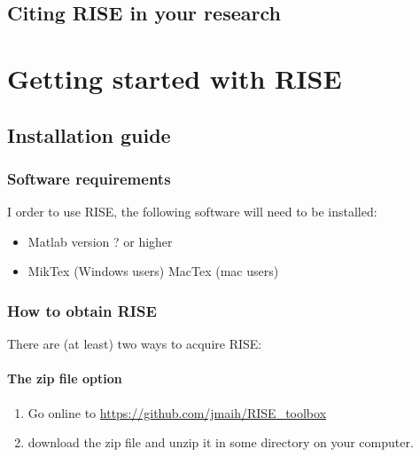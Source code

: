 \documentclass[letterpaper,10pt,english]{sphinxmanual}
\begin{document}
\section{Citing RISE in your research}
\label{intro_folder/citing_rise:citing-rise-in-your-research}\label{intro_folder/citing_rise::doc}

\chapter{Getting started with RISE}
\label{getting_started:getting-started-with-rise}\label{getting_started::doc}

\section{Installation guide}
\label{getting_started_folder/installation_configuration::doc}\label{getting_started_folder/installation_configuration:installation-guide}

\subsection{Software requirements}
\label{getting_started_folder/installation_configuration:software-requirements}
I order to use RISE, the following software will need to be installed:
\begin{itemize}
\item {} 
Matlab version ? or higher

\item {} 
MikTex (Windows users) MacTex (mac users)

\end{itemize}


\subsection{How to obtain RISE}
\label{getting_started_folder/installation_configuration:how-to-obtain-rise}
There are (at least) two ways to acquire RISE:


\subsubsection{The zip file option}
\label{getting_started_folder/installation_configuration:the-zip-file-option}\begin{enumerate}
\item {} 
Go online to \href{https://github.com/jmaih/RISE\_toolbox}{https://github.com/jmaih/RISE\_toolbox}

\item {} 
download the zip file and unzip it in some directory on your
computer.

\end{enumerate}
\end{document}
